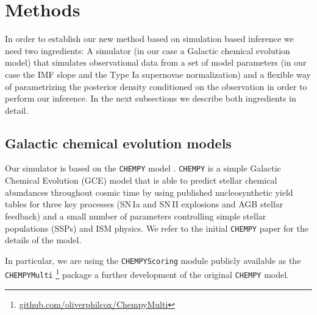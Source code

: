 \documentclass{aa}
\begin{document}
\section{Methods}
\label{sec:methods}

In order to establish our new method based on simulation based inference we need two ingredients: A simulator (in our case a Galactic chemical evolution model) that simulates observational data from a set of model parameters (in our case the IMF slope and the Type Ia supernovae normalization) and a flexible way of parametrizing the posterior density conditioned on the observation in order to perform our inference. In the next subsections we describe both ingredients in detail.

\subsection{Galactic chemical evolution models}
Our simulator is based on the \texttt{CHEMPY} model \citep{Rybizki_2017}. \texttt{CHEMPY} is a simple Galactic Chemical Evolution (GCE) model that is able to predict stellar chemical abundances throughout cosmic time by using published nucleosynthetic yield tables for three key processes (SN\,Ia and SN\,II explosions and AGB stellar feedback) and a small number of parameters controlling simple stellar populations (SSPs) and ISM physics. We refer to the initial \texttt{CHEMPY} paper \citep{Rybizki_2017} for the details of the model.

In particular, we are using the \texttt{CHEMPYScoring} module \citep{Philcox_2018} publicly available as the \texttt{CHEMPYMulti} \citep{Philcox_2019}\footnote{\href{https://github.com/oliverphilcox/ChempyMulti}{github.com/oliverphilcox/ChempyMulti}} package a further development of the original \texttt{CHEMPY} model. 
\end{document}
